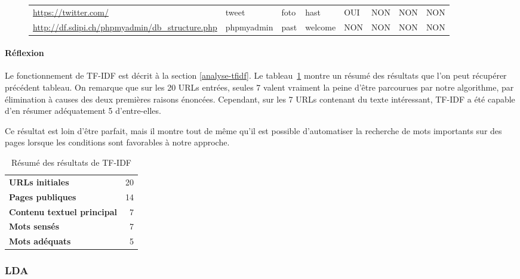 \begin{figure}
\begin{tabular}{llllllll}
\scriptsize \url{https://twitter.com/}                                  & tweet           & foto                     & hast           & \cellcolor[HTML]{9AFF99}OUI & \cellcolor[HTML]{FFCCC9}NON & \cellcolor[HTML]{FFCCC9}NON & \cellcolor[HTML]{FFCCC9}NON \\
\scriptsize \url{http://df.sdipi.ch/phpmyadmin/db\_structure.php}       & phpmyadmin      & past                     & welcome        & \cellcolor[HTML]{FFCCC9}NON & \cellcolor[HTML]{FFCCC9}NON & \cellcolor[HTML]{FFCCC9}NON & \cellcolor[HTML]{FFCCC9}NON \\ \hline
\end{tabular}
\end{figure}

			\paragraph{Réflexion}

				Le fonctionnement de TF-IDF est décrit à la section \ref{analyse-tfidf}. Le tableau~\ref{resultats-tfidf} montre un résumé des résultats que l'on peut récupérer précédent tableau. On remarque que sur les 20 URLs entrées, seules 7 valent vraiment la peine d'être parcourues par notre algorithme, par élimination à causes des deux premières raisons énoncées. Cependant, sur les 7 URLs contenant du texte intéressant, TF-IDF a été capable d'en résumer adéquatement 5 d'entre-elles.

				Ce résultat est loin d'être parfait, mais il montre tout de même qu'il est possible d'automatiser la recherche de mots importants sur des pages lorsque les conditions sont favorables à notre approche.

\FloatBarrier

				\begin{table}[h]
\centering
\caption{Résumé des résultats de TF-IDF}
\label{resultats-tfidf}
\begin{tabular}{lr}
\textbf{URLs initiales}            & 20 \\
\textbf{Pages publiques}           & 14 \\
\textbf{Contenu textuel principal} & 7  \\
\textbf{Mots sensés}               & 7  \\
\textbf{Mots adéquats}             & 5 
\end{tabular}
\end{table}

		\subsubsection{LDA}

